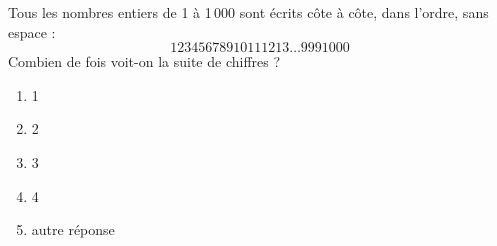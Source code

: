 Tous les nombres entiers de 1 à 1\,000 sont écrits côte à côte, dans l'ordre, sans espace :
\[12345678910111213\ldots9991000\] Combien de fois voit-on la suite de chiffres \fg ?
\begin{multicols}{5}
\begin{enumerate}[A/]
\item 1
\item 2
\item 3
\item 4
\item autre réponse
\end{enumerate}
\end{multicols}